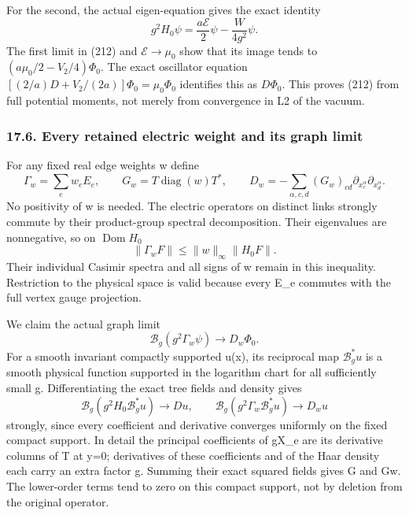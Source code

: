 \documentclass[
  11pt,
]{article}
\begin{document}
For the second, the actual eigen-equation gives the exact identity \[
 g^2H_0\psi=\frac{a\mathcal E}{2}\psi-\frac{W}{4g^2}\psi.
                                                               \tag{214}
\] The first limit in (212) and \(\mathcal E\to\mu_0\) show that its
image tends to \((a\mu_0/2-V_2/4)\Phi_0\). The exact oscillator equation
\([(2/a)D+V_2/(2a)]\Phi_0=\mu_0\Phi_0\) identifies this as \(D\Phi_0\).
This proves (212) from full potential moments, not merely from
convergence in L2 of the vacuum.

\subsubsection{17.6. Every retained electric weight and its graph
limit}\label{every-retained-electric-weight-and-its-graph-limit}

For any fixed real edge weights w define \[
 \Gamma_w=\sum_e w_eE_e,\qquad
 G_w=T\operatorname{diag}(w)T^*,\qquad
 D_w=-\sum_{\alpha,c,d}(G_w)_{cd}
                        \partial_{x_c^\alpha}\partial_{x_d^\alpha}.
                                                               \tag{215}
\] No positivity of w is needed. The electric operators on distinct
links strongly commute by their product-group spectral decomposition.
Their eigenvalues are nonnegative, so on \(\operatorname{Dom}H_0\) \[
 \|\Gamma_w F\|\le\|w\|_\infty\|H_0F\|.                \tag{216}
\] Their individual Casimir spectra and all signs of w remain in this
inequality. Restriction to the physical space is valid because every
E\_e commutes with the full vertex gauge projection.

We claim the actual graph limit \[
 \boxed{\mathcal B_g(g^2\Gamma_w\psi)\longrightarrow D_w\Phi_0.}
                                                               \tag{217}
\] For a smooth invariant compactly supported u(x), its reciprocal map
\(\mathcal B_g^*u\) is a smooth physical function supported in the
logarithm chart for all sufficiently small g. Differentiating the exact
tree fields and density gives \[
 \mathcal B_g(g^2H_0\mathcal B_g^*u)\to Du,
 \qquad
 \mathcal B_g(g^2\Gamma_w\mathcal B_g^*u)\to D_wu          \tag{218}
\] strongly, since every coefficient and derivative converges uniformly
on the fixed compact support. In detail the principal coefficients of
gX\_e are its derivative columns of T at y=0; derivatives of these
coefficients and of the Haar density each carry an extra factor g.
Summing their exact squared fields gives G and Gw. The lower-order terms
tend to zero on this compact support, not by deletion from the original
operator.
\end{document}
